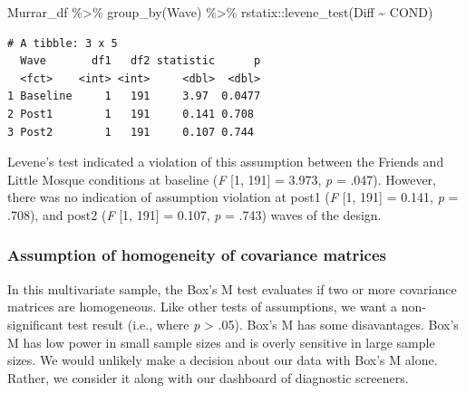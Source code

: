 \documentclass[
  11pt,
]{book}
\newenvironment{Shaded}{\begin{snugshade}}{\end{snugshade}}
\newcommand{\AttributeTok}[1]{\textcolor[rgb]{0.77,0.63,0.00}{#1}}
\newcommand{\ConstantTok}[1]{\textcolor[rgb]{0.00,0.00,0.00}{#1}}
\newcommand{\FunctionTok}[1]{\textcolor[rgb]{0.00,0.00,0.00}{#1}}
\newcommand{\NormalTok}[1]{#1}
\newcommand{\SpecialCharTok}[1]{\textcolor[rgb]{0.00,0.00,0.00}{#1}}
\newcommand{\StringTok}[1]{\textcolor[rgb]{0.31,0.60,0.02}{#1}}
\begin{document}
\begin{Shaded}
\begin{Highlighting}[]
\NormalTok{Murrar\_df }\SpecialCharTok{\%\textgreater{}\%}
    \FunctionTok{group\_by}\NormalTok{(Wave) }\SpecialCharTok{\%\textgreater{}\%}
\NormalTok{    rstatix}\SpecialCharTok{::}\FunctionTok{levene\_test}\NormalTok{(Diff }\SpecialCharTok{\textasciitilde{}}\NormalTok{ COND)}
\end{Highlighting}
\end{Shaded}

\begin{verbatim}
# A tibble: 3 x 5
  Wave       df1   df2 statistic      p
  <fct>    <int> <int>     <dbl>  <dbl>
1 Baseline     1   191     3.97  0.0477
2 Post1        1   191     0.141 0.708 
3 Post2        1   191     0.107 0.744 
\end{verbatim}

Levene's test indicated a violation of this assumption between the Friends and Little Mosque conditions at baseline (\emph{F} {[}1, 191{]} = 3.973, \emph{p} = .047). However, there was no indication of assumption violation at post1 (\emph{F} {[}1, 191{]} = 0.141, \emph{p} = .708), and post2 (\emph{F} {[}1, 191{]} = 0.107, \emph{p} = .743) waves of the design.

\hypertarget{assumption-of-homogeneity-of-covariance-matrices}{%
\subsubsection{Assumption of homogeneity of covariance matrices}\label{assumption-of-homogeneity-of-covariance-matrices}}

In this multivariate sample, the Box's M test evaluates if two or more covariance matrices are homogeneous. Like other tests of assumptions, we want a non-significant test result (i.e., where \emph{p} \textgreater{} .05). Box's M has some disavantages. Box's M has low power in small sample sizes and is overly sensitive in large sample sizes. We would unlikely make a decision about our data with Box's M alone. Rather, we consider it along with our dashboard of diagnostic screeners.

\begin{Shaded}
\end{Shaded}
\end{document}
